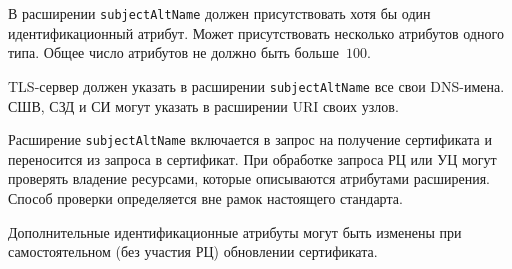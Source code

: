 В расширении \texttt{subjectAltName} должен присутствовать хотя бы один 
идентификационный атрибут. Может присутствовать несколько атрибутов одного 
типа. Общее число атрибутов не должно быть больше~$100$.

TLS-сервер должен указать в расширении \texttt{subjectAltName}
все свои DNS-имена. СШВ, СЗД и СИ могут указать в расширении 
URI своих узлов.

Расширение \texttt{subjectAltName} включается в запрос на получение сертификата 
и переносится из запроса в сертификат. При обработке запроса РЦ или УЦ 
могут проверять владение ресурсами, которые описываются атрибутами расширения. 
%
Способ проверки определяется вне рамок настоящего стандарта.

Дополнительные идентификационные атрибуты могут быть изменены при 
самостоятельном (без участия РЦ) обновлении сертификата.



